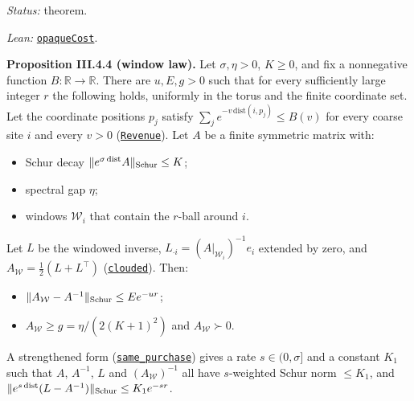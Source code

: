 \documentclass[
  letterpaper,
  11pt]{article}
\providecommand{\tightlist}{%
  \setlength{\itemsep}{0pt}\setlength{\parskip}{0pt}}
\begin{document}
\emph{Status:} theorem.

\emph{Lean:}
\href{https://github.com/yang-mills-group/OpenAI-YM-20261028/blob/3456e5e75cf8d4cd558955a5c7638fba2d68f464/YM/SectorNext/GAUSSIAN_SECTOR_CHANGE/Chosen.lean\#L102-L143}{\texttt{opaqueCost}}.

\textbf{Proposition III.4.4 (window law).} Let \(\sigma,\eta>0\),
\(K\ge0\), and fix a nonnegative function \(B:\mathbb R\to\mathbb R\).
There are \(u,E,g>0\) such that for every sufficiently large integer
\(r\) the following holds, uniformly in the torus and the finite
coordinate set. Let the coordinate positions \(p_j\) satisfy
\(\sum_j e^{-v\,\mathrm{dist}(i,p_j)}\le B(v)\) for every coarse site
\(i\) and every \(v>0\)
(\href{https://github.com/yang-mills-group/OpenAI-YM-20261028/blob/3456e5e75cf8d4cd558955a5c7638fba2d68f464/YM/SectorNext/GAUSSIAN_SECTOR_CHANGE/Windows.lean\#L125}{\texttt{Revenue}}).
Let \(A\) be a finite symmetric matrix with:

\begin{itemize}
\tightlist
\item
  Schur decay
  \(\lVert e^{\sigma\,\mathrm{dist}}A\rVert_{\rm Schur}\le K\);
\item
  spectral gap \(\eta\);
\item
  windows \(\mathcal W_i\) that contain the \(r\)-ball around \(i\).
\end{itemize}

Let \(L\) be the windowed inverse,
\(L_{\cdot i}=(A|_{\mathcal W_i})^{-1}e_i\) extended by zero, and
\(A_{\mathcal W}=\tfrac12(L+L^{\top})\)
(\href{https://github.com/yang-mills-group/OpenAI-YM-20261028/blob/3456e5e75cf8d4cd558955a5c7638fba2d68f464/YM/SectorNext/GAUSSIAN_SECTOR_CHANGE/Windows.lean\#L70}{\texttt{clouded}}).
Then:

\begin{itemize}
\tightlist
\item
  \(\lVert A_{\mathcal W}-A^{-1}\rVert_{\rm Schur}\le Ee^{-ur}\);
\item
  \(A_{\mathcal W}\ge g=\eta/(2(K+1)^2)\) and \(A_{\mathcal W}\succ0\).
\end{itemize}

A strengthened form
(\href{https://github.com/yang-mills-group/OpenAI-YM-20261028/blob/3456e5e75cf8d4cd558955a5c7638fba2d68f464/YM/AnalyticBridge/GAUSSIAN_FIELD_ALIGNMENT/Relative.lean\#L72-L118}{\texttt{same\_purchase}})
gives a rate \(s\in(0,\sigma]\) and a constant \(K_1\) such that \(A\),
\(A^{-1}\), \(L\) and \((A_{\mathcal W})^{-1}\) all have \(s\)-weighted
Schur norm \(\le K_1\), and
\(\lVert e^{s\,\mathrm{dist}}(L-A^{-1})\rVert_{\rm Schur}\le K_1e^{-sr}\).
\end{document}
